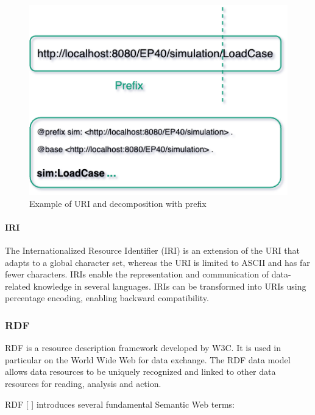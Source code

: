         \begin{figure}[h]
            \centering
            \includegraphics[scale=0.6]{images/Foundation-URI Decomposition.drawio.png}
            \caption{\label{fig:uri-example} Example of URI and decomposition with prefix}
        \end{figure}

        
        \paragraph{IRI}
        The Internationalized Resource Identifier (IRI) is an extension of the URI that adapts to a global character set, whereas the URI is limited to ASCII and has far fewer characters. IRIs enable the representation and communication of data-related knowledge in several languages. IRIs can be transformed into URIs using percentage encoding, enabling backward compatibility.


    \subsubsection{RDF}
    RDF is a resource description framework developed by W3C. It is used in particular on the World Wide Web for data exchange. The RDF data model allows data resources to be uniquely recognized and linked to other data resources for reading, analysis and action. 

    RDF [ ] introduces several fundamental Semantic Web terms:

